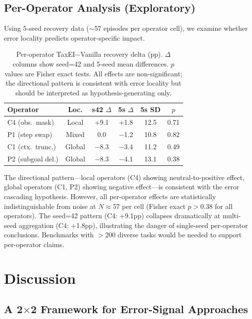 \documentclass[11pt]{article}
\begin{document}
\subsection{Per-Operator Analysis (Exploratory)}
\label{sec:per-operator}

Using 5-seed recovery data ($\sim$57 episodes per operator cell), we examine whether error locality predicts operator-specific impact.

\begin{table}[t]
\centering
\small
\begin{tabular}{lccccc}
\toprule
\textbf{Operator} & \textbf{Loc.} & \textbf{s42 $\Delta$} & \textbf{5s $\Delta$} & \textbf{5s SD} & \textbf{$p$} \\
\midrule
C4 (obs.\ mask) & Local & +9.1 & +1.8 & 12.5 & 0.71 \\
P1 (step swap) & Mixed & 0.0 & $-$1.2 & 10.8 & 0.82 \\
C1 (ctx.\ trunc.) & Global & $-$8.3 & $-$3.4 & 11.2 & 0.49 \\
P2 (subgoal del.) & Global & $-$8.3 & $-$4.1 & 13.1 & 0.38 \\
\bottomrule
\end{tabular}
\caption{Per-operator TaxEI$-$Vanilla recovery delta (pp). $\Delta$ columns show seed=42 and 5-seed mean differences. $p$ values are Fisher exact tests. All effects are non-significant; the directional pattern is consistent with error locality but should be interpreted as hypothesis-generating only.}
\label{tab:per-operator}
\end{table}

The directional pattern---local operators (C4) showing neutral-to-positive effect, global operators (C1, P2) showing negative effect---is consistent with the error cascading hypothesis.
However, all per-operator effects are statistically indistinguishable from noise at $N$$\approx$57 per cell (Fisher exact $p$$>$0.38 for all operators).
The seed=42 pattern (C4: +9.1pp) collapses dramatically at multi-seed aggregation (C4: +1.8pp), illustrating the danger of single-seed per-operator conclusions.
Benchmarks with $>$200 diverse tasks would be needed to support per-operator claims.

\section{Discussion}
\label{sec:discussion}

\subsection{A 2$\times$2 Framework for Error-Signal Approaches}
\end{document}
